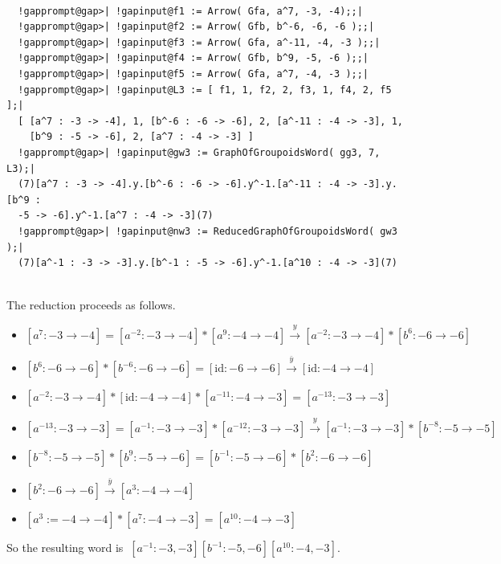 \documentclass[a4paper,11pt]{report}
\begin{document}
{{{ }

 
\begin{Verbatim}[commandchars=!@|,fontsize=\small,frame=single,label=Example]
  
  !gapprompt@gap>| !gapinput@f1 := Arrow( Gfa, a^7, -3, -4);;|
  !gapprompt@gap>| !gapinput@f2 := Arrow( Gfb, b^-6, -6, -6 );;|
  !gapprompt@gap>| !gapinput@f3 := Arrow( Gfa, a^-11, -4, -3 );;|
  !gapprompt@gap>| !gapinput@f4 := Arrow( Gfb, b^9, -5, -6 );;|
  !gapprompt@gap>| !gapinput@f5 := Arrow( Gfa, a^7, -4, -3 );;|
  !gapprompt@gap>| !gapinput@L3 := [ f1, 1, f2, 2, f3, 1, f4, 2, f5 ];|
  [ [a^7 : -3 -> -4], 1, [b^-6 : -6 -> -6], 2, [a^-11 : -4 -> -3], 1, 
    [b^9 : -5 -> -6], 2, [a^7 : -4 -> -3] ]
  !gapprompt@gap>| !gapinput@gw3 := GraphOfGroupoidsWord( gg3, 7, L3);|
  (7)[a^7 : -3 -> -4].y.[b^-6 : -6 -> -6].y^-1.[a^-11 : -4 -> -3].y.[b^9 : 
  -5 -> -6].y^-1.[a^7 : -4 -> -3](7)
  !gapprompt@gap>| !gapinput@nw3 := ReducedGraphOfGroupoidsWord( gw3 );|
  (7)[a^-1 : -3 -> -3].y.[b^-1 : -5 -> -6].y^-1.[a^10 : -4 -> -3](7)
  
\end{Verbatim}
 The reduction proceeds as follows. 
\begin{itemize}
\item  $ [a^7 : -3 \to -4] = [a^{-2} : -3 \to -4]*[a^9 : -4 \to -4] \stackrel{y}{\to}
[a^{-2} : -3 \to -4]*[b^6 : -6 \to -6] $ 
\item  $ [b^6 : -6 \to -6]*[b^{-6} : -6 \to -6] = [\mathrm{id} : -6 \to -6]
\stackrel{\bar{y}}{\to} [\mathrm{id} : -4 \to -4] $ 
\item  $ [a^{-2} : -3 \to -4]*[\mathrm{id} : -4 \to -4]*[a^{-11} : -4 \to -3] =
[a^{-13} : -3 \to -3] $ 
\item  $ [a^{-13} : -3 \to -3] = [a^{-1} : -3 \to -3]*[a^{-12} : -3 \to -3]
\stackrel{y}{\to} [a^{-1} : -3 \to -3]*[b^{-8} : -5 \to -5] $ 
\item  $ [b^{-8} : -5 \to -5]*[b^9 : -5 \to -6] = [b^{-1} : -5 \to -6]*[b^2 : -6 \to
-6] $ 
\item  $ [b^2 : -6 \to -6] \stackrel{\bar{y}}{\to} [a^3 : -4 \to -4] $ 
\item  $ [a^3 := -4 \to -4]*[a^7 : -4 \to -3] = [a^{10} : -4 \to -3] $ 
\end{itemize}
 So the resulting word is $~[a^{-1} : -3, -3][b^{-1} : -5, -6][a^{10} : -4, -3]$. }

 }

  
\end{document}
